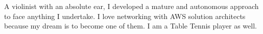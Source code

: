 

\begin{cvparagraph}\justify

A violinist with an absolute ear, I developed a mature and autonomous approach to face anything I undertake.
I love networking with AWS solution architects because my dream is to become one of them. I am a Table Tennis player as well.
\end{cvparagraph}
